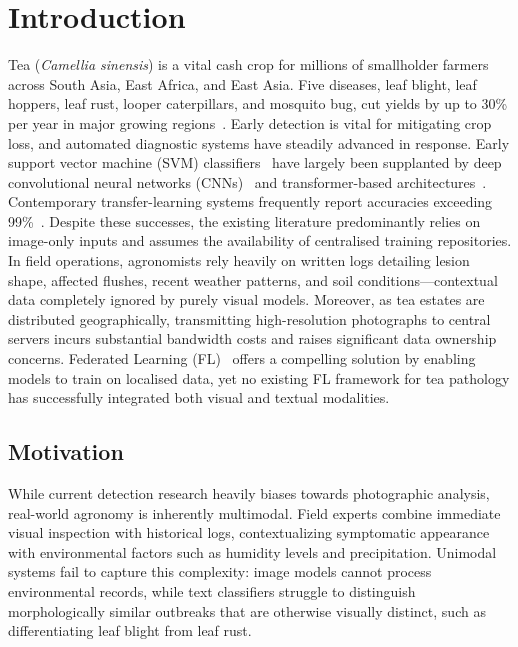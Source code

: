 \documentclass[12pt, a4paper, oneside]{Thesis}
\begin{document}
\clearpage
\pagestyle{fancy}
\tableofcontents
\listoffigures
\listoftables

\mainmatter
\pagestyle{fancy}

\chapter{Introduction}

Tea (\textit{Camellia sinensis}) is a vital cash crop for
millions of smallholder farmers across South Asia, East Africa, and East Asia.
Five diseases, leaf blight, leaf hoppers, leaf rust, looper caterpillars, and mosquito
bug, cut yields by up to 30\% per year in major growing regions~\cite{Ahmed2023}.
Early detection is vital for mitigating crop loss, and automated diagnostic systems have steadily advanced in response. Early support vector machine (SVM) classifiers~\cite{Hossain2018} have largely been supplanted by deep convolutional neural networks (CNNs)~\cite{HuGensheng2019,Latha2021} and transformer-based architectures~\cite{Wu2025,Soeb2023}. Contemporary transfer-learning systems frequently report accuracies exceeding 99\%~\cite{Madhavi2025,Dipty2025}. Despite these successes, the existing literature predominantly relies on image-only inputs and assumes the availability of centralised training repositories. In field operations, agronomists rely heavily on written logs detailing lesion shape, affected flushes, recent weather patterns, and soil conditions---contextual data completely ignored by purely visual models. Moreover, as tea estates are distributed geographically, transmitting high-resolution photographs to central servers incurs substantial bandwidth costs and raises significant data ownership concerns. Federated Learning (FL)~\cite{McMahan2017} offers a compelling solution by enabling models to train on localised data, yet no existing FL framework for tea pathology has successfully integrated both visual and textual modalities.

\section{Motivation}

While current detection research heavily biases towards photographic analysis, real-world agronomy is inherently multimodal. Field experts combine immediate visual inspection with historical logs, contextualizing symptomatic appearance with environmental factors such as humidity levels and precipitation. Unimodal systems fail to capture this complexity: image models cannot process environmental records, while text classifiers struggle to distinguish morphologically similar outbreaks that are otherwise visually distinct, such as differentiating leaf blight from leaf rust.
\end{document}
